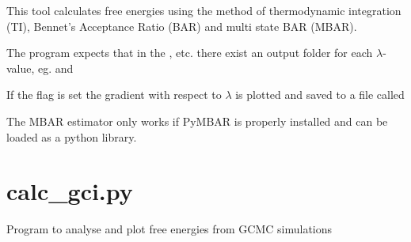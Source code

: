 \documentclass[letterpaper,10pt,english]{sphinxmanual}
\begin{document}

%
\begin{sphinxVerbatim}[commandchars=\\\{\}]
  
      
      
       
\end{sphinxVerbatim}


This tool calculates free energies using the method of thermodynamic integration (TI), Bennet’s Acceptance Ratio (BAR) and multi state BAR (MBAR).

The program expects that in the ,  etc. there exist an output folder for each \(\lambda\)-value, eg.  and 

If the  flag is set the gradient with respect to \(\lambda\) is plotted and saved to a file called 

The MBAR estimator only works if PyMBAR is properly installed and can be loaded as a python library.


\section{calc\_gci.py}
\label{\detokenize{tools:calc-gci-py}}

Program to analyse and plot free energies from GCMC simulations
\end{document}
